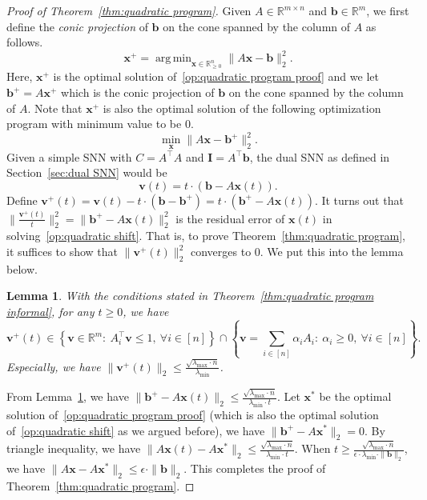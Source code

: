 \documentclass[11pt]{article}
\newtheorem{lemma}{Lemma}[section]
\theoremstyle{remark}
\theoremstyle{definition}
\newcommand{\bx}{\mathbf{x}}
\newcommand{\bb}{\mathbf{b}}
\newcommand{\bv}{\mathbf{v}}
\newcommand{\bI}{\mathbf{I}}
\newcommand{\ATA}{A^\top A}
\DeclareMathOperator*{\argmin}{arg\,min}
\newcommand{\R}{{\mathbb R}} %
\begin{document}
\begin{proof}[Proof of Theorem~\ref{thm:quadratic program}]
	Given $A\in\R^{m\times n}$ and $\bb\in\R^m$, we first define the \textit{conic projection} of $\bb$ on the cone spanned by the column of $A$ as follows.
	\begin{equation*}
	\bx^+ = \argmin_{\bx\in\R^n_{\geq0}} \|A\bx-\bb\|_2^2.
	\end{equation*}
	Here, $\bx^+$ is the optimal solution of~\eqref{op:quadratic program proof} and we let $\bb^+=A\bx^+$ which is the conic projection of $\bb$ on the cone spanned by the column of $A$. Note that $\bx^+$ is also the optimal solution of the following optimization program with minimum value to be $0$.
	\begin{equation}\label{op:quadratic shift}
	\min_{\bx}\|A\bx-\bb^+\|_2^2.
	\end{equation}
	Given a simple SNN with $C=\ATA$ and $\bI=A^\top\bb$, the dual SNN as defined in Section~\ref{sec:dual SNN} would be
	\begin{equation*}
	\bv(t) = t\cdot\left(\bb-A\bx(t)\right).
	\end{equation*}
	Define $\bv^+(t)=\bv(t)-t\cdot\left(\bb-\bb^+\right)=t\cdot\left(\bb^+-A\bx(t)\right)$. It turns out that $\|\frac{\bv^+(t)}{t}\|_2^2=\|\bb^+-A\bx(t)\|_2^2$ is the residual error of $\bx(t)$ in solving~\eqref{op:quadratic shift}. That is, to prove Theorem~\ref{thm:quadratic program}, it suffices to show that $\|\bv^+(t)\|_2^2$ converges to $0$. We put this into the lemma below.
	\begin{lemma}\label{lem:quadratic dual bounded}
		With the conditions stated in Theorem~\ref{thm:quadratic program informal}, for any $t\geq0$, we have
		$$
		\bv^+(t)\in\left\{\bv\in\R^m:\ A_i^\top\bv\leq1,\ \forall i\in[n]\right\}\cap\left\{\bv=\sum_{i\in[n]}\alpha_iA_i:\ \alpha_i\geq0,\ \forall i\in[n] \right\}.
		$$
		Especially, we have $\|\bv^+(t)\|_2\leq\frac{\sqrt{\lambda_{\max}\cdot n}}{\lambda_{\min}}$.
	\end{lemma}
	
	From Lemma~\ref{lem:quadratic dual bounded}, we have $\|\bb^+-A\bx(t)\|_2\leq\frac{\sqrt{\lambda_{\max}\cdot n}}{\lambda_{\min}\cdot t}$. Let $\bx^*$ be the optimal solution of~\eqref{op:quadratic program proof} (which is also the optimal solution of~\eqref{op:quadratic shift} as we argued before), we have $\|\bb^+-A\bx^*\|_2=0$. By triangle inequality, we have $\|A\bx(t)-A\bx^*\|_2\leq\frac{\sqrt{\lambda_{\max}\cdot n}}{\lambda_{\min}\cdot t}$. When $t\geq\frac{\sqrt{\lambda_{\max}\cdot n}}{\epsilon\cdot\lambda_{\min}\cdot\|\bb\|_2}$, we have $\|A\bx-A\bx^*\|_2\leq\epsilon\cdot\|\bb\|_2$.
	This completes the proof of Theorem~\ref{thm:quadratic program}.
\end{proof}
\end{document}
